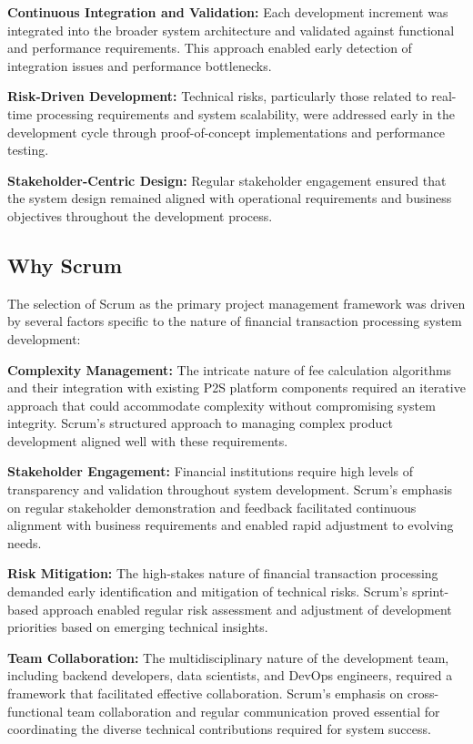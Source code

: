 \textbf{Continuous Integration and Validation:} Each development increment was integrated into the broader system architecture and validated against functional and performance requirements. This approach enabled early detection of integration issues and performance bottlenecks.

\textbf{Risk-Driven Development:} Technical risks, particularly those related to real-time processing requirements and system scalability, were addressed early in the development cycle through proof-of-concept implementations and performance testing.

\textbf{Stakeholder-Centric Design:} Regular stakeholder engagement ensured that the system design remained aligned with operational requirements and business objectives throughout the development process.

\subsection{Why Scrum}

The selection of Scrum as the primary project management framework was driven by several factors specific to the nature of financial transaction processing system development:

\textbf{Complexity Management:} The intricate nature of fee calculation algorithms and their integration with existing P2S platform components required an iterative approach that could accommodate complexity without compromising system integrity. Scrum's structured approach to managing complex product development aligned well with these requirements.

\textbf{Stakeholder Engagement:} Financial institutions require high levels of transparency and validation throughout system development. Scrum's emphasis on regular stakeholder demonstration and feedback facilitated continuous alignment with business requirements and enabled rapid adjustment to evolving needs.

\textbf{Risk Mitigation:} The high-stakes nature of financial transaction processing demanded early identification and mitigation of technical risks. Scrum's sprint-based approach enabled regular risk assessment and adjustment of development priorities based on emerging technical insights.

\textbf{Team Collaboration:} The multidisciplinary nature of the development team, including backend developers, data scientists, and DevOps engineers, required a framework that facilitated effective collaboration. Scrum's emphasis on cross-functional team collaboration and regular communication proved essential for coordinating the diverse technical contributions required for system success.


